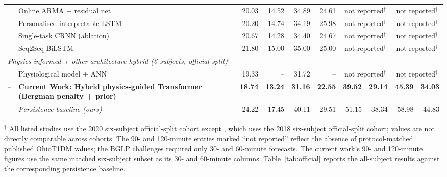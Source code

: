 \documentclass[journal]{IEEEtran}
\begin{document}
\begin{table}[t]
{\begin{tabular}{l>{\raggedright\arraybackslash}p{2.6cm}rrrrrrrr}
\cite{ref72} & Online ARMA + residual net & 20.03 & 14.52 & 34.89 & 24.61 & \multicolumn{2}{c}{not reported$^{\dagger}$} & \multicolumn{2}{c}{not reported$^{\dagger}$} \\
\cite{ref73} & Personalised interpretable LSTM & 20.20 & 14.74 & 34.19 & 25.98 & \multicolumn{2}{c}{not reported$^{\dagger}$} & \multicolumn{2}{c}{not reported$^{\dagger}$} \\
\cite{ref71} & Single-task CRNN (ablation) & 20.67 & 14.28 & 34.40 & 24.67 & \multicolumn{2}{c}{not reported$^{\dagger}$} & \multicolumn{2}{c}{not reported$^{\dagger}$} \\
\cite{ref74} & Seq2Seq BiLSTM & 21.80 & 15.00 & 35.00 & 25.00 & \multicolumn{2}{c}{not reported$^{\dagger}$} & \multicolumn{2}{c}{not reported$^{\dagger}$} \\
\midrule
\multicolumn{10}{l}{\textit{Physics-informed + other-architecture hybrid (6 subjects, official split)$^{\dagger}$}} \\
\cite{ref58} & Physiological model + ANN & 19.33 & -- & 31.72 & -- & \multicolumn{2}{c}{not reported$^{\dagger}$} & \multicolumn{2}{c}{not reported$^{\dagger}$} \\
\midrule
-- & \textbf{Current Work: Hybrid physics-guided Transformer (Bergman penalty + prior)} & \textbf{18.74} & \textbf{13.24} & \textbf{31.16} & \textbf{22.55} & \textbf{39.52} & \textbf{29.14} & \textbf{45.39} & \textbf{34.03} \\
-- & \emph{Persistence baseline (ours)} & 24.22 & 17.45 & 40.11 & 29.51 & 51.15 & 38.34 & 58.98 & 44.83 \\
\bottomrule
\end{tabular}%
}
\vspace{2pt}
\raggedright\footnotesize
$^{\dagger}$ All listed studies use the 2020 six-subject official-split cohort except \cite{ref58}, which uses the 2018 six-subject official-split cohort; values are not directly comparable across cohorts. The 90- and 120-minute entries marked ``not reported'' reflect the absence of protocol-matched published OhioT1DM values; the BGLP challenges required only 30- and 60-minute forecasts. The current work's 90- and 120-minute figures use the same matched six-subject subset as its 30- and 60-minute columns. Table~\ref{tab:official} reports the all-subject results against the corresponding persistence baseline.
\end{table}
 
\end{document}
